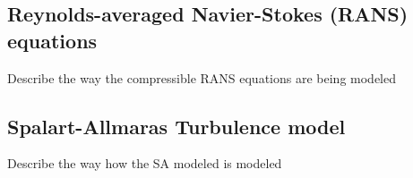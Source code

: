 
\subsection*{Reynolds-averaged Navier-Stokes (RANS) equations}
Describe the way the compressible RANS equations are being modeled 

\subsection*{Spalart-Allmaras Turbulence model}
Describe the way how the SA modeled is modeled

